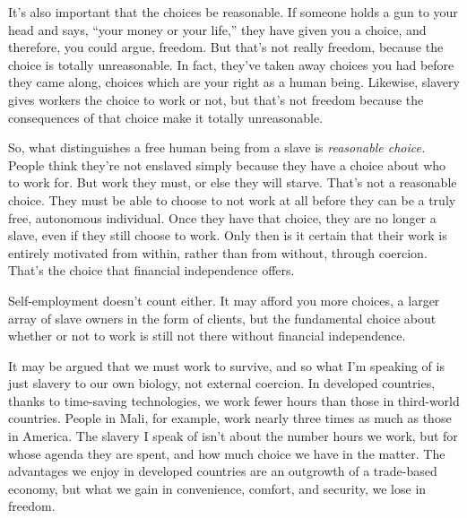It's also important that the choices be reasonable. If someone holds a gun to your head and says, ``your money or your life,'' they have given you a choice, and therefore, you could argue, freedom. But that's not really freedom, because the choice is totally unreasonable. In fact, they've taken away choices you had before they came along, choices which are your right as a human being. Likewise, slavery gives workers the choice to work or not, but that's not freedom because the consequences of that choice make it totally unreasonable.

So, what distinguishes a free human being from a slave is \emph{reasonable choice.} People think they're not enslaved simply because they have a choice about who to work for. But work they must, or else they will starve. That's not a reasonable choice. They must be able to choose to not work at all before they can be a truly free, autonomous individual. Once they have that choice, they are no longer a slave, even if they still choose to work. Only then is it certain that their work is entirely motivated from within, rather than from without, through coercion. That's the choice that financial independence offers.

Self-employment doesn't count either. It may afford you more choices, a larger array of slave owners in the form of clients, but the fundamental choice about whether or not to work is still not there without financial independence.

It may be argued that we must work to survive, and so what I'm speaking of is just slavery to our own biology, not external coercion. In developed countries, thanks to time-saving technologies, we work fewer hours than those in third-world countries. People in Mali, for example, work nearly three times as much as those in America. The slavery I speak of isn't about the number hours we work, but for whose agenda they are spent, and how much choice we have in the matter. The advantages we enjoy in developed countries are an outgrowth of a trade-based economy, but what we gain in convenience, comfort, and security, we lose in freedom.

